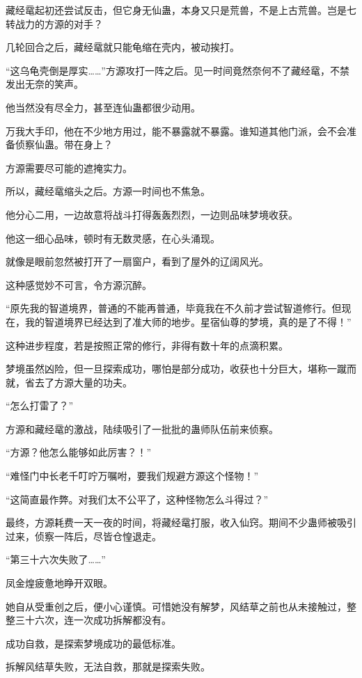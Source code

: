 \begin{this_body}
藏经鼋起初还尝试反击，但它身无仙蛊，本身又只是荒兽，不是上古荒兽。岂是七转战力的方源的对手？

几轮回合之后，藏经鼋就只能龟缩在壳内，被动挨打。

“这乌龟壳倒是厚实……”方源攻打一阵之后。见一时间竟然奈何不了藏经鼋，不禁发出无奈的笑声。

他当然没有尽全力，甚至连仙蛊都很少动用。

万我大手印，他在不少地方用过，能不暴露就不暴露。谁知道其他门派，会不会准备侦察仙蛊。带在身上？

方源需要尽可能的遮掩实力。

所以，藏经鼋缩头之后。方源一时间也不焦急。

他分心二用，一边故意将战斗打得轰轰烈烈，一边则品味梦境收获。

他这一细心品味，顿时有无数灵感，在心头涌现。

就像是眼前忽然被打开了一扇窗户，看到了屋外的辽阔风光。

这种感觉妙不可言，令方源沉醉。

“原先我的智道境界，普通的不能再普通，毕竟我在不久前才尝试智道修行。但现在，我的智道境界已经达到了准大师的地步。星宿仙尊的梦境，真的是了不得！”

这种进步程度，若是按照正常的修行，非得有数十年的点滴积累。

梦境虽然凶险，但一旦探索成功，哪怕是部分成功，收获也十分巨大，堪称一蹴而就，省去了方源大量的功夫。

“怎么打雷了？”

方源和藏经鼋的激战，陆续吸引了一批批的蛊师队伍前来侦察。

“方源？他怎么能够如此厉害？！”

“难怪门中长老千叮咛万嘱咐，要我们规避方源这个怪物！”

“这简直最作弊。对我们太不公平了，这种怪物怎么斗得过？”

最终，方源耗费一天一夜的时间，将藏经鼋打服，收入仙窍。期间不少蛊师被吸引过来，侦察一阵后，尽皆仓惶退走。

“第三十六次失败了……”

凤金煌疲惫地睁开双眼。

她自从受重创之后，便小心谨慎。可惜她没有解梦，风结草之前也从未接触过，整整三十六次，连一次成功拆解都没有。

成功自救，是探索梦境成功的最低标准。

拆解风结草失败，无法自救，那就是探索失败。


\end{this_body}
